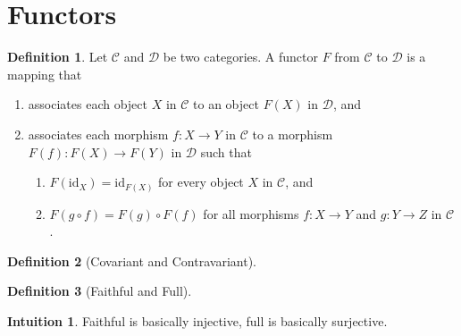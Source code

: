 \documentclass[a4paper]{scrartcl}
\theoremstyle{definition}
\newtheorem{definition}{Definition}[]
\newtheorem*{intuition}{Intuition}
\begin{document}
\newpage
\section{Functors}

\begin{defbox}
  \begin{definition}
    Let \(\mathcal{C}\) and \(\mathcal{D}\) be two categories. A functor \(F\) from \(\mathcal{C}\) to \(\mathcal{D}\) is a mapping that
    \begin{enumerate}
      \item associates each object \(X\) in \(\mathcal{C}\) to an object \(F(X)\) in \(\mathcal{D}\), and
      \item associates each morphism \(f: X \rightarrow Y\) in \(\mathcal{C}\) to a morphism \(F(f): F(X) \rightarrow F(Y)\) in \(\mathcal{D}\) such that
      \begin{enumerate}
        \item \(F(\mathrm{id}_X) = \mathrm{id}_{F(X)}\) for every object \(X\) in \(\mathcal{C}\), and
        \item \(F(g \circ f) = F(g) \circ F(f)\) for all morphisms \(f: X \rightarrow Y\) and \(g: Y \rightarrow Z\) in \(\mathcal{C}\).
      \end{enumerate}
    \end{enumerate}
  \end{definition}
\end{defbox}

\begin{defbox}
  \begin{definition}[Covariant and Contravariant]
    
  \end{definition}
\end{defbox}

\begin{defbox}
  \begin{definition}[Faithful and Full]
    
  \end{definition}
\end{defbox}

\begin{intbox}
  \begin{intuition}
    Faithful is basically injective, full is basically surjective.
  \end{intuition}
\end{intbox}
\end{document}
